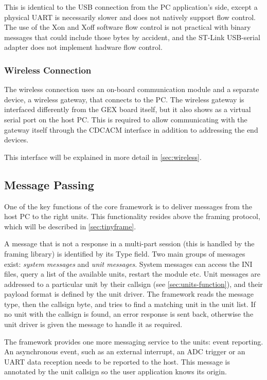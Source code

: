 This is identical to the \gls{USB} connection from the \gls{PC} application's side, except a physical \gls{UART} is necessarily slower and does not natively support flow control. The use of the Xon and Xoff software flow control is not practical with binary messages that could include those bytes by accident, and the ST-Link \gls{USB}-serial adapter does not implement hadware flow control.

\subsubsection{Wireless Connection}

The wireless connection uses an on-board communication module and a separate device, a wireless gateway, that connects to the \gls{PC}. The wireless gateway is interfaced differently from the GEX board itself, but it also shows as a virtual serial port on the host \gls{PC}. This is required to allow communicating with the gateway itself through the \gls{CDCACM} interface in addition to addressing the end devices.

This interface will be explained in more detail in \cref{sec:wireless}.

\subsection{Message Passing} \label{sec:message_passing}

One of the key functions of the core framework is to deliver messages from the host \gls{PC} to the right units. This functionality resides above the framing protocol, which will be described in \cref{sec:tinyframe}.

A message that is not a response in a multi-part session (this is handled by the framing library) is identified by its Type field. Two main groups of messages exist: \textit{system messages} and \textit{unit messages}. System messages can access the INI files, query a list of the available units, restart the module etc. Unit messages are addressed to a particular unit by their callsign (see \cref{sec:units-function}), and their payload format is defined by the unit driver. The framework reads the message type, then the callsign byte, and tries to find a matching unit in the unit list. If no unit with the callsign is found, an error response is sent back, otherwise the unit driver is given the message to handle it as required.

The framework provides one more messaging service to the units: event reporting. An asynchronous event, such as an external interrupt, an \gls{ADC} trigger or an \gls{UART} data reception needs to be reported to the host. This message is annotated by the unit callsign so the user application knows its origin.


